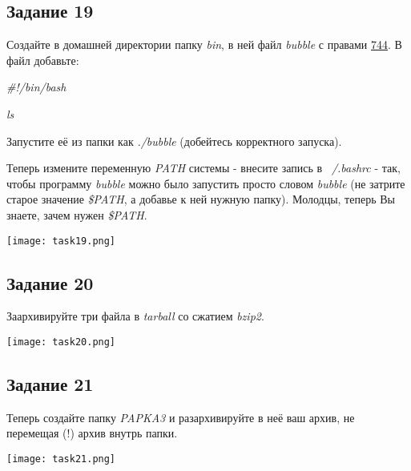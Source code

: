 \documentclass[12pt, a4paper]{report}
\begin{document}
			\subsection*{Задание 19}
			Создайте в домашней директории папку \textit{bin}, в ней файл \textit{bubble} с правами \underline{744}. В файл добавьте: \par
			\textit{\#!/bin/bash} \par
			\textit{ls} \par
			Запустите её из папки как \textit{./bubble} (добейтесь корректного запуска). \par
			Теперь измените переменную \textit{PATH} системы - внесите запись в \textit{~/.bashrc} - так, чтобы программу \textit{bubble} можно было запустить просто словом \textit{bubble} (не затрите старое значение \textit{\$PATH}, а добавье к ней нужную папку). Молодцы, теперь Вы знаете, зачем нужен \textit{\$PATH}.
			\lstset{style=mystyle}
			
			\begin{center}
				\texttt{[image: task19.png]}
			\end{center}

			\subsection*{Задание 20}
			Заархивируйте три файла в \textit{tarball} со сжатием \textit{bzip2}.
			\lstset{style=mystyle}
			
			\begin{center}
				\texttt{[image: task20.png]}
			\end{center}

			\subsection*{Задание 21}
			Теперь создайте папку \textit{PAPKA3} и разархивируйте в неё ваш архив, не перемещая (!) архив внутрь папки.
			\lstset{style=mystyle}
			
			\begin{center}
				\texttt{[image: task21.png]}
			\end{center}
\end{document}

